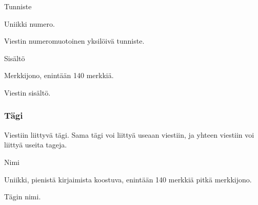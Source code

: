 \documentclass{article}
\begin{document}
\begin{description}[itemsep=0pt]
    \item[Attribuutti] Tunniste
    \item[Arvojoukko] Uniikki numero.
    \item[Kuvailu] Viestin numeromuotoinen yksilöivä tunniste.
\end{description}

\begin{description}[itemsep=0pt]
    \item[Attribuutti] Sisältö
    \item[Arvojoukko] Merkkijono, enintään 140 merkkiä.
    \item[Kuvailu] Viestin sisältö.
\end{description}

\subsubsection{Tägi}

Viestiin liittyvä tägi. Sama tägi voi liittyä useaan viestiin, ja yhteen viestiin voi liittyä useita tageja.

\begin{description}[itemsep=0pt]
    \item[Attribuutti] Nimi
    \item[Arvojoukko] Uniikki, pienistä kirjaimista koostuva, enintään 140 merkkiä pitkä merkkijono.
    \item[Kuvailu] Tägin nimi.
\end{description}
\end{document}
